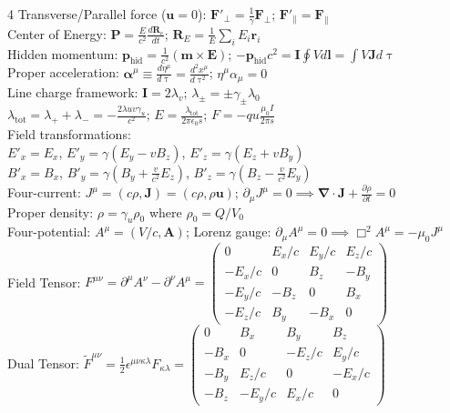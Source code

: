 \documentclass[a4paper,twoside]{article}
\begin{document}
\begin{multicols*}{4}
Transverse/Parallel force ($\bm u=0$): \(\bm F'_{\perp} = \frac{1}{\gamma} \bm F_{\perp}\); \quad \(\bm F'_{\parallel} = \bm F_{\parallel}\) \\
Center of Energy: \(\bm P = \frac{E}{c^2}\frac{d\bm R_e}{dt}\); \quad \(\bm R_E = \frac{1}{E}\sum_i E_i \bm r_i\) \\
Hidden momentum: \(\bm p_{\text{hid}} = \frac{1}{c^2} (\bm m\times \bm E )\); \quad \(-\bm p_{\text{hid}} c^2 = \bm I \oint V d\bm l = \int V \bm J d\uptau\) \\
Proper acceleration: \(\bm \alpha^\mu \equiv \frac{d\eta^\mu}{d \uptau} = \frac{d^2 x^\mu}{d \uptau^2}\); \quad \(\eta^\mu \alpha_\mu = 0\) \\
Line charge framework: \(\bm I = 2 \lambda_v\); \quad \(\lambda_\pm = \pm \gamma_\pm \lambda_0\) \\
\(\lambda_{\text{tot}} = \lambda_+ + \lambda_- = -\frac{2\lambda u v \gamma_u}{c^2}\); \quad \(E = \frac{\lambda_{\text{tot}}}{2\pi\epsilon_0 s}\); \quad \(F = -qu \frac{\mu_0 I}{2\pi s}\) \\
Field transformations: \\
\(E'_x = E_x\), \quad \(E'_y = \gamma(E_y - v B_z)\), \quad \(E'_z = \gamma(E_z + v B_y)\) \\
\(B'_x = B_x\), \quad \(B'_y = \gamma(B_y + \frac{v}{c^2}E_z)\), \quad \(B'_z = \gamma(B_z - \frac{v}{c^2}E_y)\) \\
Four-current: \(J^\mu = (c\rho, \bm J) = (c\rho, \rho \bm u)\); \quad \(\partial_\mu J^\mu = 0 \implies \bm \nabla \cdot \bm J + \frac{\partial \rho}{\partial t} = 0\) \\
Proper density: $\rho = \gamma_u \rho_0$ where $\rho_0 = Q/V_0$ \\
Four-potential: \(A^\mu = (V/c, \bm A)\); \quad Lorenz gauge: \(\partial_\mu A^\mu = 0 \implies \Box^2 A^\mu = -\mu_0 J^\mu\) \\
Field Tensor: \(F^{\mu\nu} = \partial^\mu A^\nu - \partial^\nu A^\mu = \begin{pmatrix} 0 & E_x/c & E_y/c & E_z/c \\ -E_x/c & 0 & B_z & -B_y \\ -E_y/c & -B_z & 0 & B_x \\ -E_z/c & B_y & -B_x & 0 \end{pmatrix}\) \\
Dual Tensor: \(\tilde{F}^{\mu\nu} = \frac{1}{2}\epsilon^{\mu\nu\kappa\lambda}F_{\kappa\lambda} = \begin{pmatrix} 0 & B_x & B_y & B_z \\ -B_x & 0 & -E_z/c & E_y/c \\ -B_y & E_z/c & 0 & -E_x/c \\ -B_z & -E_y/c & E_x/c & 0 \end{pmatrix}\) \\

\end{multicols*}
\end{document}
